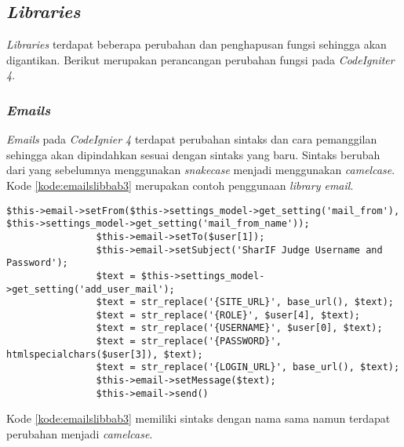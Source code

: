 \subsection{\textit{Libraries}}
\textit{Libraries} terdapat beberapa perubahan dan penghapusan fungsi sehingga akan digantikan. Berikut merupakan perancangan perubahan fungsi pada \textit{CodeIgniter 4}.

\subsubsection{\textit{Emails}}
\textit{Emails} pada \textit{CodeIgnier 4} terdapat perubahan sintaks dan cara pemanggilan sehingga akan dipindahkan sesuai dengan sintaks yang baru. Sintaks berubah dari yang sebelumnya menggunakan \textit{snakecase} menjadi menggunakan \textit{camelcase}. Kode \ref{kode:emailslibbab3} merupakan contoh penggunaan \textit{library email}.

\begin{lstlisting}[caption=Contoh perubahan \textit{library emails}, label=kode:emailslibbab3]
$this->email->setFrom($this->settings_model->get_setting('mail_from'), $this->settings_model->get_setting('mail_from_name'));
				$this->email->setTo($user[1]);
				$this->email->setSubject('SharIF Judge Username and Password');
				$text = $this->settings_model->get_setting('add_user_mail');
				$text = str_replace('{SITE_URL}', base_url(), $text);
				$text = str_replace('{ROLE}', $user[4], $text);
				$text = str_replace('{USERNAME}', $user[0], $text);
				$text = str_replace('{PASSWORD}', htmlspecialchars($user[3]), $text);
				$text = str_replace('{LOGIN_URL}', base_url(), $text);
				$this->email->setMessage($text);
				$this->email->send()
\end{lstlisting}

Kode \ref{kode:emailslibbab3} memiliki sintaks dengan nama sama namun terdapat perubahan menjadi \textit{camelcase}.

